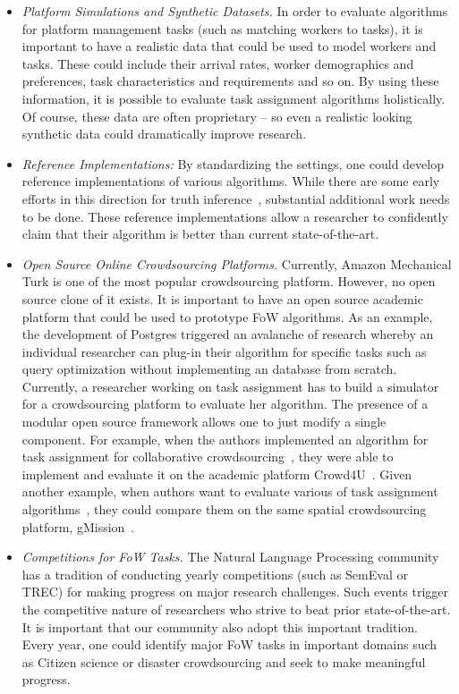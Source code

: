 \begin{itemize}
    \item \emph{Platform Simulations and Synthetic Datasets.}
        In order to evaluate algorithms for platform management tasks (such as matching workers to tasks),
        it is important to have a realistic data that could be used to model workers and tasks.
        These could include their arrival rates, worker demographics and preferences,
        task characteristics and requirements and so on.
        By using these information, it is possible to evaluate task assignment algorithms holistically.
        Of course, these data are often proprietary -- so even a realistic looking synthetic data
        could dramatically improve research.
    \item \emph{Reference Implementations:}
        By standardizing the settings, one could develop reference implementations of various algorithms.
        While there are some early efforts in this direction for truth inference~\cite{zheng2017truth},
        substantial additional work needs to be done.
        These reference implementations allow a researcher to confidently claim that their algorithm
        is better than current state-of-the-art.
    \item \emph{Open Source Online Crowdsourcing Platforms.}
        Currently, Amazon Mechanical Turk is one of the most popular crowdsourcing platform.
        However, no open source clone of it exists.
        It is important to have an open source academic platform that could be used to
        prototype FoW algorithms.
        As an example, the development of Postgres triggered an avalanche of research whereby
        an individual researcher can plug-in their algorithm for specific tasks such as query optimization
        without implementing an database from scratch.
        Currently, a researcher working on task assignment has to build a simulator for a crowdsourcing
        platform to evaluate her algorithm.
        The presence of a modular open source framework allows one to just modify a single component. For example, when the authors implemented an algorithm for task assignment for
        collaborative crowdsourcing~\cite{rahman2015task},
        they were able to implement and evaluate it on the academic platform Crowd4U~\cite{ikeda2016collaborative}. Given another example, when authors want to evaluate various of task assignment algorithms~\cite{yongxin2016online}, they could compare them on the same spatial crowdsourcing platform, gMission~\cite{ChenFZLXCCCTZ14}.
    \item \emph{Competitions for FoW Tasks.}
        The Natural Language Processing community has a tradition of conducting
        yearly competitions (such as SemEval or TREC) for making progress on major research challenges.
        Such events trigger the competitive nature of researchers who strive to beat prior state-of-the-art.
        It is important that our community also adopt this important tradition.
        Every year, one could identify major FoW tasks in important domains such as  Citizen science or disaster crowdsourcing and seek to make meaningful progress.
\end{itemize}
